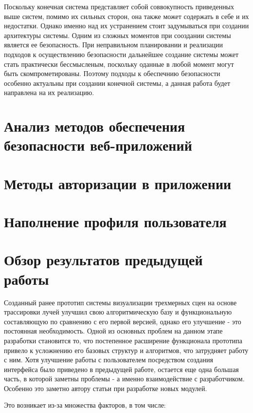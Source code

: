 Поскольку конечная система представляет собой соввокупность приведенных выше систем, помимо их сильных сторон, она также может содержать в себе и их недостатки. Однако именно над их устранением стоит задумываться при создании архитектуры системы. Одним из сложных моментов при сооздании системы является ее безопасность. При неправильном планировании и реализации подходов к осуществлению безопасности дальнейшее создание системы может стать практически бессмысленым, поскольку оданные в любой момент могут быть скомпрометированы. Поэтому подходы к обеспечнию безопасности особенно актуальны при создании конечной системы, а данная работа будет направлена на их реализацию. 

\section{Анализ методов обеспечения безопасности веб-приложений}

\section{Методы авторизации в приложении}

\section{Наполнение профиля пользователя}




\section{Обзор результатов предыдущей работы}

Созданный ранее прототип системы визуализации трехмерных сцен на основе трассировки лучей улучшил свою алгоритмическую базу и функциональную составляющую по сравнению с его первой версией, однако его улучшение - это постоянная необходимость. Одной из основных проблем на данном этапе разработки становится то, что постепенное расширение функционала прототипа привело к усложнению его базовых структур и алгоритмов, что затрудняет работу с ним. Хотя улучшение работы с пользователем посредством создания интерфейса было приведено в предыдущей работе, остается еще одна большая часть, в которой заметны проблемы - а именно взаимодействие с разработчиком. Особенно это заметно автору статьи при разработке новых модулей. 

Это возникает из-за множества факторов, в том числе:


